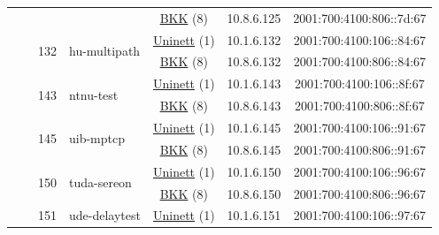 \begin{small}
\begin{center}
\begin{longtable}{|c|c|c|c|c|c|c|c|}
  &  &  &  & \multicolumn{2}{|c|}{\tiny{\href{http://bkk.no}{BKK} (8)}} & \tiny{10.8.6.125} & \tiny{2001:700:4100:806::7d:67} \\* \cline{3-3}\cline{4-4}\cline{5-5}\cline{6-6}\cline{7-7}\cline{8-8}
  &  & \multirow{2}{*}{\tiny{132}} & \multicolumn{1}{|l|}{\multirow{2}{*}{\tiny{hu-multipath}}} & \multicolumn{2}{|c|}{\tiny{\href{https://www.uninett.no}{Uninett} (1)}} & \tiny{10.1.6.132} & \tiny{2001:700:4100:106::84:67} \\* \cline{5-5}\cline{6-6}\cline{7-7}\cline{8-8}
  &  &  &  & \multicolumn{2}{|c|}{\tiny{\href{http://bkk.no}{BKK} (8)}} & \tiny{10.8.6.132} & \tiny{2001:700:4100:806::84:67} \\* \cline{3-3}\cline{4-4}\cline{5-5}\cline{6-6}\cline{7-7}\cline{8-8}
  &  & \multirow{2}{*}{\tiny{143}} & \multicolumn{1}{|l|}{\multirow{2}{*}{\tiny{ntnu-test}}} & \multicolumn{2}{|c|}{\tiny{\href{https://www.uninett.no}{Uninett} (1)}} & \tiny{10.1.6.143} & \tiny{2001:700:4100:106::8f:67} \\* \cline{5-5}\cline{6-6}\cline{7-7}\cline{8-8}
  &  &  &  & \multicolumn{2}{|c|}{\tiny{\href{http://bkk.no}{BKK} (8)}} & \tiny{10.8.6.143} & \tiny{2001:700:4100:806::8f:67} \\* \cline{3-3}\cline{4-4}\cline{5-5}\cline{6-6}\cline{7-7}\cline{8-8}
  &  & \multirow{2}{*}{\tiny{145}} & \multicolumn{1}{|l|}{\multirow{2}{*}{\tiny{uib-mptcp}}} & \multicolumn{2}{|c|}{\tiny{\href{https://www.uninett.no}{Uninett} (1)}} & \tiny{10.1.6.145} & \tiny{2001:700:4100:106::91:67} \\* \cline{5-5}\cline{6-6}\cline{7-7}\cline{8-8}
  &  &  &  & \multicolumn{2}{|c|}{\tiny{\href{http://bkk.no}{BKK} (8)}} & \tiny{10.8.6.145} & \tiny{2001:700:4100:806::91:67} \\* \cline{3-3}\cline{4-4}\cline{5-5}\cline{6-6}\cline{7-7}\cline{8-8}
  &  & \multirow{2}{*}{\tiny{150}} & \multicolumn{1}{|l|}{\multirow{2}{*}{\tiny{tuda-sereon}}} & \multicolumn{2}{|c|}{\tiny{\href{https://www.uninett.no}{Uninett} (1)}} & \tiny{10.1.6.150} & \tiny{2001:700:4100:106::96:67} \\* \cline{5-5}\cline{6-6}\cline{7-7}\cline{8-8}
  &  &  &  & \multicolumn{2}{|c|}{\tiny{\href{http://bkk.no}{BKK} (8)}} & \tiny{10.8.6.150} & \tiny{2001:700:4100:806::96:67} \\* \cline{3-3}\cline{4-4}\cline{5-5}\cline{6-6}\cline{7-7}\cline{8-8}
  &  & \multirow{2}{*}{\tiny{151}} & \multicolumn{1}{|l|}{\multirow{2}{*}{\tiny{ude-delaytest}}} & \multicolumn{2}{|c|}{\tiny{\href{https://www.uninett.no}{Uninett} (1)}} & \tiny{10.1.6.151} & \tiny{2001:700:4100:106::97:67} \\* \cline{5-5}\cline{6-6}\cline{7-7}\cline{8-8}

\end{longtable}
\end{center}
\end{small}
